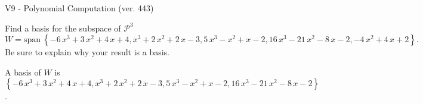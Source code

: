 \begin{exercise}
  \begin{exerciseTitle}V9 - Polynomial Computation (ver. 443)\end{exerciseTitle}
  \begin{exerciseStatement}
    Find a basis for the subspace of \(\mathcal{P}^3\) 
\[W=\mathrm{span}\ \left\{-6 \, x^{3} + 3 \, x^{2} + 4 \, x + 4 , x^{3} + 2 \, x^{2} + 2 \, x - 3 , 5 \, x^{3} - x^{2} + x - 2 , 16 \, x^{3} - 21 \, x^{2} - 8 \, x - 2 , -4 \, x^{2} + 4 \, x + 2\right\}.\]
 Be sure to explain why your result is a basis.


  \end{exerciseStatement}
  \begin{exerciseAnswer}
   A basis of \(W\) is  \(\left\{-6 \, x^{3} + 3 \, x^{2} + 4 \, x + 4 , x^{3} + 2 \, x^{2} + 2 \, x - 3 , 5 \, x^{3} - x^{2} + x - 2 , 16 \, x^{3} - 21 \, x^{2} - 8 \, x - 2\right\}\).
  


  \end{exerciseAnswer}
\end{exercise}